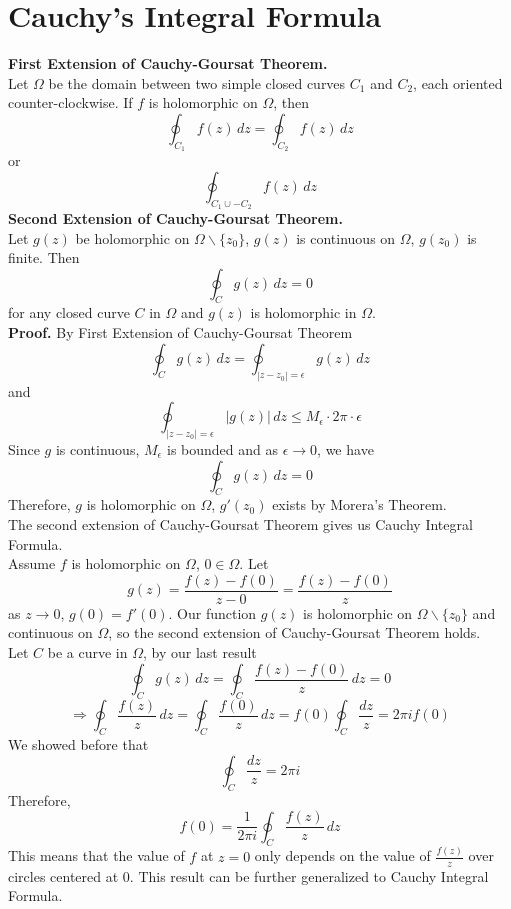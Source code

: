 \documentclass[11pt]{article}
\begin{document}
\section{Cauchy's Integral Formula}
\textbf{First Extension of Cauchy-Goursat Theorem.} \\
Let $\Omega$ be the domain between two simple closed curves $C_1$ and $C_2$, each oriented counter-clockwise. If $f$ is holomorphic on $\Omega$, then 
$$ \oint_{C_1}f(z) \,dz = \oint_{C_2}f(z) \,dz $$
or
$$\oint_{C_1 \cup -C_2}f(z) \, dz$$
\newline
\newline
\textbf{Second Extension of Cauchy-Goursat Theorem. } \\
Let $g(z)$ be holomorphic on $\Omega \backslash \{z_0\}$, $g(z)$ is continuous on $\Omega$, $g(z_0)$ is finite. Then
$$\oint_C g(z) \,dz = 0$$
for any closed curve $C$ in $\Omega$ and $g(z)$ is holomorphic in $\Omega$. \\
\textbf{Proof.} By First Extension of Cauchy-Goursat Theorem 
$$\oint_C g(z) \,dz = \oint_{|z - z_0| = \epsilon} g(z) \, dz$$
and 
$$\oint_{|z - z_0| = \epsilon} |g(z)| \, dz \leqslant M_{\epsilon}\cdot 2\pi \cdot \epsilon$$
Since $g$ is continuous, $M_\epsilon$ is bounded and as $\epsilon \to 0$, we have 
$$\oint_C g(z) \,dz = 0$$
Therefore, $g$ is holomorphic on $\Omega$, $g'(z_0)$ exists by Morera's Theorem. \\
\newline
The second extension of Cauchy-Goursat Theorem gives us Cauchy Integral Formula. \\
Assume $f$ is holomorphic on $\Omega$, $0 \in \Omega$. Let 
$$g(z) = \frac{f(z) - f(0)}{z - 0} = \frac{f(z) - f(0)}{z}$$ 
as $z \to 0$, $g(0) = f'(0)$. Our function $g(z)$ is holomorphic on $\Omega \backslash \{z_0\}$ and continuous on $\Omega$, so the second extension of Cauchy-Goursat Theorem holds. \\
Let $C$ be a curve in $\Omega$, by our last result 
$$\oint_C g(z) \, dz = \oint_C \frac{f(z) - f(0)}{z} \, dz = 0$$
$$\Rightarrow \oint_C \frac{f(z)}{z} \, dz = \oint_C \frac{f(0)}{z} \, dz = f(0)\oint_C \frac{dz}{z} = 2\pi if(0)$$
We showed before that 
$$ \oint_C \frac{dz}{z} = 2\pi i$$
Therefore, 
$$f(0) = \frac{1}{2\pi i} \oint_C \frac{f(z)}{z} \,dz$$
This means that the value of $f$ at $z = 0$ only depends on the value of $\frac{f(z)}{z}$ over circles centered at 0. This result can be further generalized to Cauchy Integral Formula. \\
\newline
\end{document}

